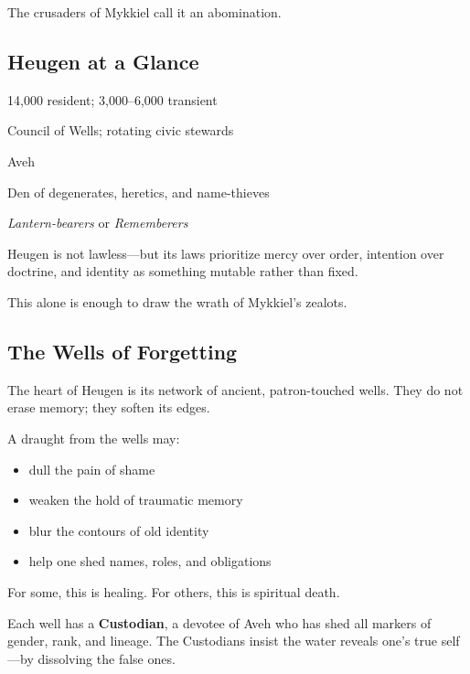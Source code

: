 \documentclass[11pt]{book}
\begin{document}
The crusaders of Mykkiel call it an abomination.

\subsection{Heugen at a Glance}

\begin{description}[leftmargin=1.8cm]
    \item[Population:] 14,000 resident; 3,000--6,000 transient  
    \item[Government:] Council of Wells; rotating civic stewards  
    \item[Dominant Patron:] Aveh  
    \item[Outsider Perception:] Den of degenerates, heretics, and name-thieves  
    \item[Local Term for Outsiders:] \emph{Lantern-bearers} or \emph{Rememberers}
\end{description}

Heugen is not lawless---but its laws prioritize mercy over order, intention over doctrine,
and identity as something mutable rather than fixed.

This alone is enough to draw the wrath of Mykkiel's zealots.

\subsection{The Wells of Forgetting}

The heart of Heugen is its network of ancient, patron-touched wells.  
They do not erase memory; they soften its edges.

A draught from the wells may:
\begin{itemize}[leftmargin=*]
    \item dull the pain of shame  
    \item weaken the hold of traumatic memory  
    \item blur the contours of old identity  
    \item help one shed names, roles, and obligations  
\end{itemize}

For some, this is healing.  
For others, this is spiritual death.

Each well has a \textbf{Custodian}, a devotee of Aveh who has shed all markers of gender, rank, and lineage. The Custodians insist the water reveals one's true self---by dissolving the false ones.
\end{document}
